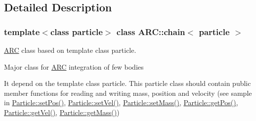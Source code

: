 \subsection{Detailed Description}
\subsubsection*{template$<$class particle$>$\newline
class A\+R\+C\+::chain$<$ particle $>$}

\hyperlink{namespaceARC}{A\+RC} class based on template class particle. 

Major class for \hyperlink{namespaceARC}{A\+RC} integration of few bodies

It depend on the template class particle. This particle class should contain public member functions for reading and writing mass, position and velocity (see sample in \hyperlink{classParticle_a97d76b66aed57834c105b78b10643b81}{Particle\+::set\+Pos()}, \hyperlink{classParticle_a07c405254ac3f03854e7523ff473c828}{Particle\+::set\+Vel()}, \hyperlink{classParticle_a620f479862b90468a77da4e9cf5c0ff5}{Particle\+::set\+Mass()}, \hyperlink{classParticle_a4ec76421cddd91b1f27357fb182f6923}{Particle\+::get\+Pos()}, \hyperlink{classParticle_ab3d63df7f8c22f232b096ae33b6ea3ac}{Particle\+::get\+Vel()}, \hyperlink{classParticle_a2576aff503f68e78ced91406512b1255}{Particle\+::get\+Mass()})

